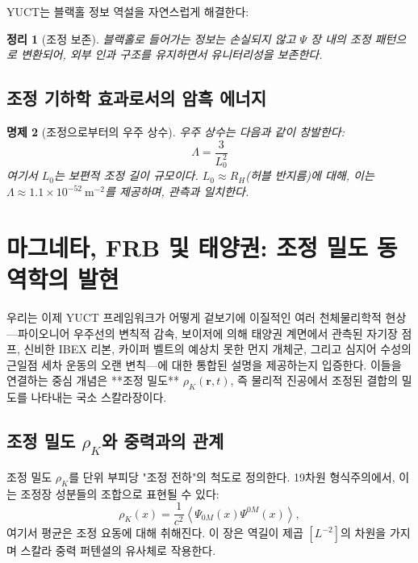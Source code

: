 \documentclass[11pt,a4paper]{article}
\newtheorem{theorem}{정리}[section]
\newtheorem{proposition}[theorem]{명제}
\theoremstyle{remark}
\begin{document}
	YUCT는 블랙홀 정보 역설을 자연스럽게 해결한다:
	
	\begin{theorem}[조정 보존]
		블랙홀로 들어가는 정보는 손실되지 않고 $\Psi$ 장 내의 조정 패턴으로 변환되어, 외부 인과 구조를 유지하면서 유니터리성을 보존한다.
	\end{theorem}
	
	\subsection{조정 기하학 효과로서의 암흑 에너지}
	
	\begin{proposition}[조정으로부터의 우주 상수]
		우주 상수는 다음과 같이 창발한다:
		\[
		\Lambda = \frac{3}{L_0^2}
		\]
		여기서 $L_0$는 보편적 조정 길이 규모이다. $L_0 \approx R_H$(허블 반지름)에 대해, 이는 $\Lambda \approx 1.1 \times 10^{-52}\ \text{m}^{-2}$를 제공하며, 관측과 일치한다.
	\end{proposition}
	
	\section{마그네타, FRB 및 태양권: 조정 밀도 동역학의 발현}
	\label{sec:coord_density}
	
	우리는 이제 YUCT 프레임워크가 어떻게 겉보기에 이질적인 여러 천체물리학적 현상—파이오니어 우주선의 변칙적 감속, 보이저에 의해 태양권 계면에서 관측된 자기장 점프, 신비한 IBEX 리본, 카이퍼 벨트의 예상치 못한 먼지 개체군, 그리고 심지어 수성의 근일점 세차 운동의 오랜 변칙—에 대한 통합된 설명을 제공하는지 입증한다. 이들을 연결하는 중심 개념은 **조정 밀도** \(\rho_K(\mathbf{r},t)\), 즉 물리적 진공에서 조정된 결합의 밀도를 나타내는 국소 스칼라장이다.
	
	\subsection{조정 밀도 \(\rho_K\)와 중력과의 관계}
	\label{subsec:rho_K_definition}
	
	조정 밀도 \(\rho_K\)를 단위 부피당 "조정 전하"의 척도로 정의한다. 19차원 형식주의에서, 이는 조정장 성분들의 조합으로 표현될 수 있다:
	\begin{equation}
		\rho_K(x) = \frac{1}{c^2} \left\langle \Psi_{0M}(x) \Psi^{0M}(x) \right\rangle,
		\label{eq:coord:rho_K_def}
	\end{equation}
	여기서 평균은 조정 요동에 대해 취해진다. 이 장은 역길이 제곱 \([L^{-2}]\)의 차원을 가지며 스칼라 중력 퍼텐셜의 유사체로 작용한다.
	
\end{document}
